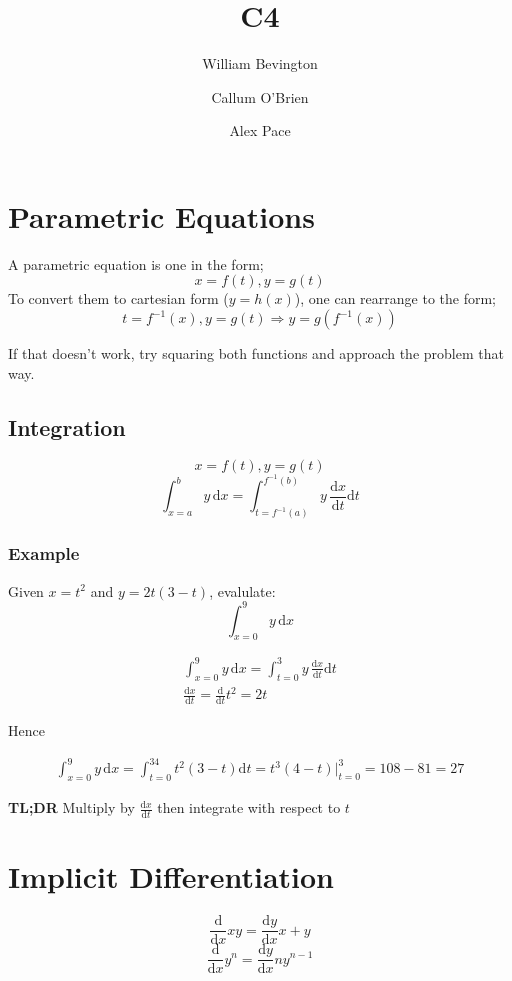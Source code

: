 \documentclass{article}
\title{C4}
\author{William Bevington \and Callum O'Brien \and Alex Pace}
\begin{document}
\maketitle
\tableofcontents
\newpage

\section{Parametric Equations}

A parametric equation is one in the form;
\[x=f(t),y=g(t)\]
\noindent To convert them to cartesian form ($y=h(x)$), one can rearrange to the form;
\[t=f^{-1}(x),y=g(t)\Rightarrow y=g(f^{-1}(x))\]

\noindent If that doesn't work, try squaring both functions and approach the problem that way.

\subsection{Integration}

\[x=f(t),y=g(t)\]
\[\int_{x=a}^{b}y\,\textrm{d}x=\int_{t=f^{-1}(a)}^{f^{-1}(b)}y\,\frac{\textrm{d}x}{\textrm{d}t}\textrm{d}t\]

\subsubsection{Example}
Given $x=t^2$ and $y=2t(3-t)$, evalulate:
\[\int_{x=0}^9y\,\textrm{d}x\]

\begin{eqnarray}
	\int_{x=0}^9y\,\textrm{d}x=\int_{t=0}^3y\,\frac{\textrm{d}x}{\textrm{d}t}\textrm{d}t\\
	\frac{\textrm{d}x}{\textrm{d}t}=\frac{\textrm{d}}{\textrm{d}t}t^2=2t
\end{eqnarray}

Hence

\begin{eqnarray}
	\int_{x=0}^9y\,\textrm{d}x=\int_{t=0}^34t^2(3-t)\textrm{d}t=t^3(4-t)|_{t=0}^3=108-81=27
\end{eqnarray}

\noindent \textbf{TL;DR} Multiply by $\frac{\textrm{d}x}{\textrm{d}t}$ then integrate with respect to $t$

\section{Implicit Differentiation}

\[\frac{\textrm{d}}{\textrm{d}x}xy=\frac{\textrm{d}y}{\textrm{d}x}x+y\]
\[\frac{\textrm{d}}{\textrm{d}x}y^n=\frac{\textrm{d}y}{\textrm{d}x}ny^{n-1}\]
\end{document}
